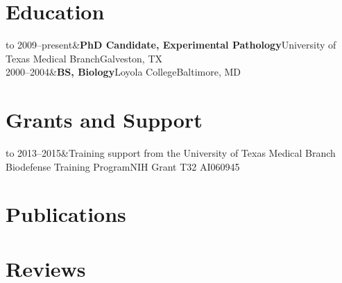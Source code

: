 \documentclass[11pt]{report}	%
\theoremstyle{definition}
\theoremstyle{remark}
\begin{document}
\section*{Education}
\begin{tabu} to \textwidth {X[.25,r]|X[L]}
	2009--present&\textbf{PhD Candidate, Experimental Pathology}\newline University of Texas Medical Branch\newline Galveston, TX\\
	2000--2004&\textbf{BS, Biology}\newline Loyola College\newline Baltimore, MD\\
\end{tabu}

\section*{Grants and Support}
\begin{tabu} to \textwidth {X[.25,r]|X[L]}
	2013--2015&Training support from the University of Texas Medical Branch Biodefense Training Program\newline NIH Grant T32 AI060945\\
\end{tabu}


\section*{Publications}
\begin{refsection}
\nocite{Beck:2014cm}

\nocite{Beck:2013fg}

\setlength\bibitemsep{.2cm} %
\newrefcontext[sorting=ydnt]	
\printbibliography[heading=none]
\end{refsection}

\section*{Reviews}
\begin{refsection}

\nocite{Beck:2015eu}

\setlength\bibitemsep{.2cm} %
\newrefcontext[sorting=ydnt]
\printbibliography[heading=none]
\end{refsection}
\end{document}
